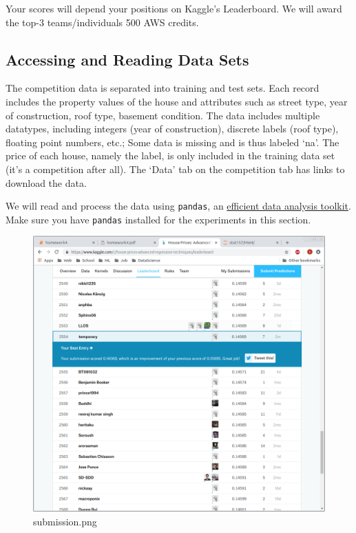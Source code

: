 \documentclass[11pt]{article}
\makeatletter
\def\maxwidth{\ifdim\Gin@nat@width>\linewidth\linewidth
    \else\Gin@nat@width\fi}
\let\Oldincludegraphics\includegraphics
\renewcommand{\includegraphics}[1]{\Oldincludegraphics[width=.8\maxwidth]{#1}}
\makeatother
\begin{document}
Your scores will depend your positions on Kaggle's Leaderboard. We will
award the top-3 teams/individuals 500 AWS credits.

\hypertarget{accessing-and-reading-data-sets}{%
\subsection{Accessing and Reading Data
Sets}\label{accessing-and-reading-data-sets}}

The competition data is separated into training and test sets. Each
record includes the property values of the house and attributes such as
street type, year of construction, roof type, basement condition. The
data includes multiple datatypes, including integers (year of
construction), discrete labels (roof type), floating point numbers,
etc.; Some data is missing and is thus labeled `na'. The price of each
house, namely the label, is only included in the training data set (it's
a competition after all). The `Data' tab on the competition tab has
links to download the data.

We will read and process the data using \texttt{pandas}, an
\href{http://pandas.pydata.org/pandas-docs/stable/}{efficient data
analysis toolkit}. Make sure you have \texttt{pandas} installed for the
experiments in this section.

    \begin{figure}
\centering
\includegraphics{submission.png}
\caption{submission.png}
\end{figure}
\end{document}

